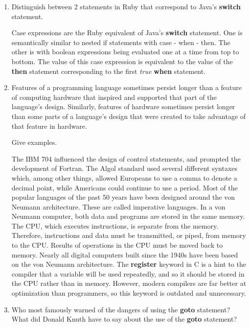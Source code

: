 \begin{enumerate}
\begin{answer}
    \end{answer}
  \item Distinguish between 2 statements in Ruby
    that correspond to Java's \textbf{switch} statement.

    \begin{answer}  
    Case expressions are the Ruby equivalent of Java's \textbf{switch} statement. One is semantically similar to nested if statements with case - when - then. The other is with boolean expressions being evaluated one at a time from top to bottom. The value of this case expression is equivalent to the value of the \textbf{then} statement corresponding to the first \textit{true} \textbf{when} statement.
    \end{answer}

  \item Features of a programming language sometimes persist
    longer than a feature of computing hardware that inspired
    and supported that part of the language's design.
    Similarly, features of hardware sometimes persist longer
    than some parts of a language's design that were created
    to take advantage of that feature in hardware.

    Give examples.
    \begin{answer}
    The IBM 704 influenced the design of control statements, and prompted the development of Fortran. 
    The Algol standard used several different syntaxes which, among other things, allowed Europeans to use a comma to denote a decimal point, while Americans could continue to use a period.
	Most of the popular languages of the past 50 years have been designed around the von Neumann architecture. These are called imperative languages. In a von Neumann computer, both data and programs are stored in the same memory. The CPU, which executes instructions, is separate from the memory. Therefore, instructions and data must be transmitted, or piped, from memory to the CPU. Results of operations in the CPU must be moved back to memory. Nearly all digital computers built since the 1940s have been based on the von Neumann architecture.
    The \textbf{register} keyword in C is a hint to the compiler that a variable will be used repeatedly, and so it should be stored in the CPU rather than in memory. However, modern compilers are far better at optimization than programmers, so this keyword is outdated and unnecessary.
    \end{answer}

  \item Who most famously warned of the dangers of using the
    \textbf{goto} statement? What did Donald Knuth have to
    say about the use of the \textbf{goto} statement?
    

\end{enumerate}
